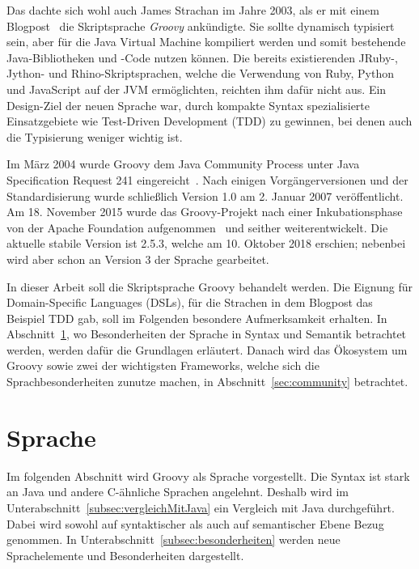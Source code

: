 Das dachte sich wohl auch James Strachan im Jahre 2003, als er mit einem Blogpost~\cite{james-strachan-blog} die Skriptsprache \emph{Groovy} ankündigte.
Sie sollte dynamisch typisiert sein, aber für die Java Virtual Machine kompiliert werden und somit bestehende Java-Bibliotheken und -Code nutzen können.
Die bereits existierenden JRuby-, Jython- und Rhino-Skriptsprachen, welche die Verwendung von Ruby, Python und JavaScript auf der JVM ermöglichten, reichten ihm dafür nicht aus.
Ein Design-Ziel der neuen Sprache war, durch kompakte Syntax spezialisierte Einsatzgebiete wie Test-Driven Development (TDD) zu gewinnen, bei denen auch die Typisierung weniger wichtig ist.

Im März 2004 wurde Groovy dem Java Community Process unter Java Specification Request 241 eingereicht~\cite{jcp:jsr241}.
Nach einigen Vorgängerversionen und der Standardisierung wurde schließlich Version 1.0 am 2. Januar 2007 veröffentlicht.
Am 18. November 2015 wurde das Groovy-Projekt nach einer Inkubationsphase von der Apache Foundation aufgenommen~\cite{apache-incubator:groovy} und seither weiterentwickelt.
Die aktuelle stabile Version ist 2.5.3, welche am 10. Oktober 2018 erschien; nebenbei wird aber schon an Version 3 der Sprache gearbeitet.

In dieser Arbeit soll die Skriptsprache Groovy behandelt werden.
Die Eignung für Domain-Specific Languages (DSLs), für die Strachen in dem Blogpost das Beispiel TDD gab, soll im Folgenden besondere Aufmerksamkeit erhalten.
In Abschnitt~\ref{sec:sprache}, wo Besonderheiten der Sprache in Syntax und Semantik betrachtet werden, werden dafür die Grundlagen erläutert.
Danach wird das Ökosystem um Groovy sowie zwei der wichtigsten Frameworks, welche sich die Sprachbesonderheiten zunutze machen, in Abschnitt~\ref{sec:community} betrachtet.


\section{Sprache}\label{sec:sprache}

Im folgenden Abschnitt wird Groovy als Sprache vorgestellt.
Die Syntax ist stark an Java und andere C-ähnliche Sprachen angelehnt.
Deshalb wird im Unterabschnitt~\ref{subsec:vergleichMitJava} ein Vergleich mit Java durchgeführt.
Dabei wird sowohl auf syntaktischer als auch auf semantischer Ebene Bezug genommen.
In Unterabschnitt~\ref{subsec:besonderheiten} werden neue Sprachelemente und Besonderheiten dargestellt.

